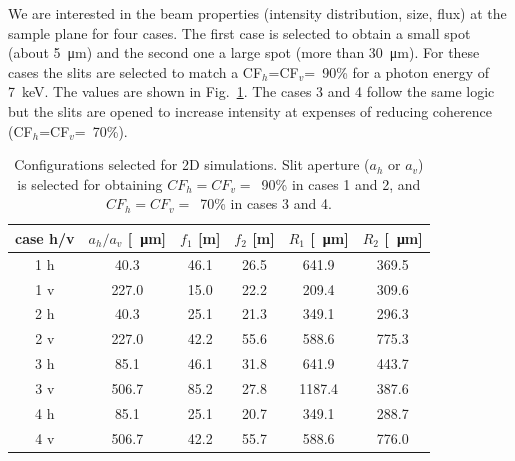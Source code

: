 \documentclass{iucr}              %
\begin{document}

We are interested in the beam properties (intensity distribution, size, flux) at the sample plane for four cases.
The first case is selected to obtain a small spot (about \SI{5}{\micro\meter}) and the second one a large spot (more than \SI{30}{\micro\meter}). For these cases the slits are selected to match a CF$_h$=CF$_v$=~90\% for a photon energy of \SI{7}{keV}. The values are shown in Fig.~\ref{table:2Dusercases}. The cases 3 and 4 follow the same logic but the slits are opened to increase intensity at expenses of reducing coherence  (CF$_h$=CF$_v$=~70\%). 


\begin{table}[]
    \label{table:2Dusercases}
    \caption{Configurations selected for 2D simulations. Slit aperture ($a_h$ or $a_v$) is selected for obtaining $CF_h=CF_v=$~90\% in cases 1 and 2, and $CF_h=CF_v=$~70\% in cases 3 and 4. 
    }
    \begin{tabular}{c|c|c|c|c|c}
         case h/v & $a_h/a_v$ [\SI{}{\micro\meter}] & $f_1$ [m] & $f_2$ [m] & $R_1$ [\SI{}{\micro\meter}]& $R_2$ [\SI{}{\micro\meter}] \\
         \hline
1 h &      40.3 & 46.1 &     26.5 &     641.9 &     369.5 
\\
1 v &      227.0 & 15.0 &     22.2 &     209.4 &     309.6 
\\
\hline
2 h &      40.3 & 25.1 &     21.3 &     349.1 &     296.3  
\\
2 v &      227.0 & 42.2 &     55.6 &     588.6 &     775.3 
\\
\hline \hline
3 h &      85.1 & 46.1 &     31.8 &     641.9 &     443.7 
\\
3 v &      506.7 & 85.2 &     27.8 &     1187.4 &     387.6  
\\
\hline
4 h &      85.1 & 25.1 &     20.7 &     349.1 &     288.7 
\\
4 v &      506.7 & 42.2 &     55.7 &     588.6 &     776.0 

    \end{tabular}
\end{table}
\end{document}
